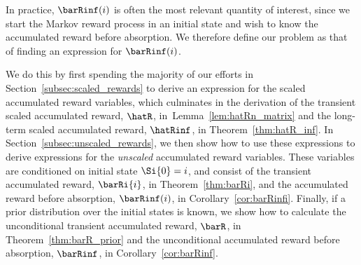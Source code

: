
In practice, $\barRinf(i)$ is often the most relevant quantity of interest, since we start the Markov reward process in an initial state and wish to know the accumulated reward before absorption.  We therefore define our problem as that of finding an expression for $\barRinf(i)$.  

We do this by first spending the majority of our efforts in Section~\ref{subsec:scaled_rewards} to derive an expression for the scaled accumulated reward variables, which culminates in the derivation of the transient scaled accumulated reward, $\hatR$, in~Lemma~\ref{lem:hatRn_matrix} and the long-term scaled accumulated reward, $\hatRinf$, in Theorem~\ref{thm:hatR_inf}.  In Section~\ref{subsec:unscaled_rewards}, we then show how to use these expressions to derive expressions for the \emph{unscaled} accumulated reward variables.  These variables are conditioned on initial state $\Si{0} = i$, and consist of the transient accumulated reward, $\barRi{i}$, in Theorem~\ref{thm:barRi}, and the accumulated reward before absorption, $\barRinf(i)$, in Corollary~\ref{cor:barRinfi}.  Finally, if a prior distribution over the initial states is known, we show how to calculate the unconditional transient accumulated reward, $\barR$, in Theorem~\ref{thm:barR_prior} and the unconditional accumulated reward before absorption, $\barRinf$, in Corollary~\ref{cor:barRinf}.





